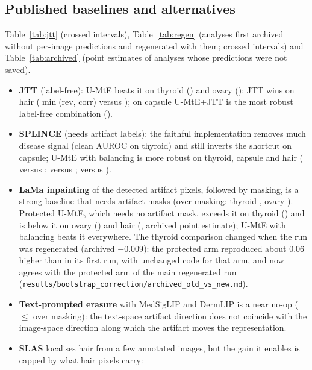 \subsection{Published baselines and alternatives}
Table~\ref{tab:jtt} (crossed intervals), Table~\ref{tab:regen} (analyses first archived without per-image predictions and
regenerated with them; crossed intervals) and Table~\ref{tab:archived} (point estimates of analyses whose predictions were
not saved).
\begin{itemize}[leftmargin=*]\itemsep1pt
\item \textbf{JTT} (label-free): U-MtE beats it on thyroid (\sSixScthyroidmtejtt) and ovary (\sSixScovarymtejtt); JTT wins
on hair ($\min$(rev, corr) \sSixBlDermoscopyjtt{} versus \sSixBlDermoscopymte); on capsule U-MtE+JTT is the most robust
label-free combination (\sSixBlCapsuleumtejtt).
\item \textbf{SPLINCE} (needs artifact labels): the faithful implementation removes much disease signal (clean AUROC
\sSixBlCleanThyroidsplice{} on thyroid) and still inverts the shortcut on capsule; U-MtE with balancing is more robust
on thyroid, capsule and hair (\sSixBlThyroidmtebalanced{} versus \sSixBlThyroidsplice; \sSixBlCapsulemtebalanced{} versus
\sSixBlCapsulesplice; \sSixBlDermoscopymtebalanced{} versus \sSixBlDermoscopysplice).
\item \textbf{LaMa inpainting} of the detected artifact pixels, followed by masking, is a strong baseline that needs artifact
masks (over masking: thyroid \sSixRgLaMamaskingthyroidmasklamamask, ovary \sSixRgLaMamaskingovarymasklamamask). Protected
U-MtE, which needs no artifact mask, exceeds it on thyroid (\sSixRgLaMamaskingthyroidmteprotectmasklama) and is below it on
ovary (\sSixRgLaMamaskingovarymteprotectmasklama) and hair (\sSixArLaMaisicmteprotectmasklama, archived point estimate);
U-MtE with balancing beats it everywhere. The thyroid comparison changed when the run was regenerated (archived
$-0.009$): the protected arm reproduced about 0.06 higher than in its first run, with unchanged code for that arm, and
now agrees with the protected arm of the main regenerated run (\texttt{results/bootstrap\_correction/archived\_old\_vs\_new.md}).
\item \textbf{Text-prompted erasure} with MedSigLIP and DermLIP is a near no-op ($\le$ \sSixArtextpromptedovarymasktexterasemask{}
over masking): the text-space artifact direction does not coincide with the image-space direction along which the artifact
moves the representation.
\item \textbf{SLAS} localises hair from a few annotated images, but the gain it enables is capped by what hair pixels carry:

\end{itemize}

